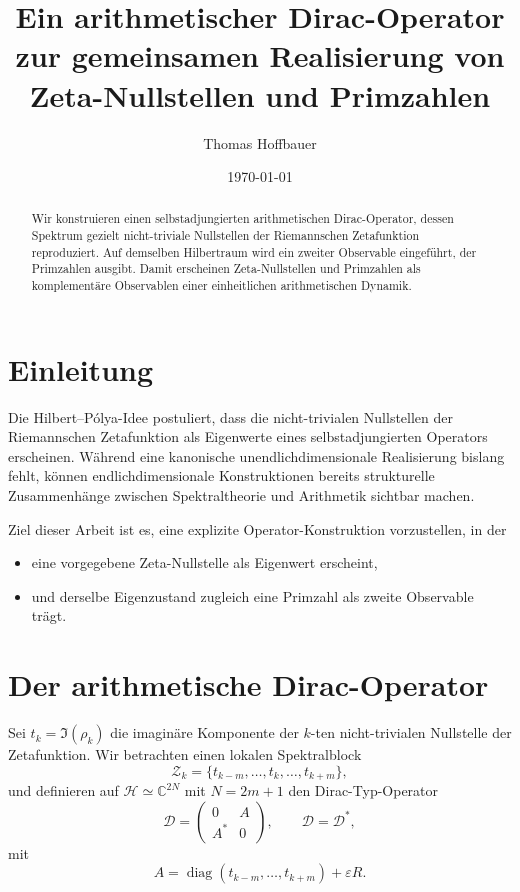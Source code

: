 \documentclass[11pt,a4paper]{article}
\title{Ein arithmetischer Dirac-Operator\\
zur gemeinsamen Realisierung von\\
Zeta-Nullstellen und Primzahlen}
\author{Thomas Hoffbauer}
\date{\today}
\begin{document}
\maketitle

\begin{abstract}
Wir konstruieren einen selbstadjungierten arithmetischen Dirac-Operator,
dessen Spektrum gezielt nicht-triviale Nullstellen der Riemannschen
Zetafunktion reproduziert.
Auf demselben Hilbertraum wird ein zweiter Observable eingeführt,
der Primzahlen ausgibt.
Damit erscheinen Zeta-Nullstellen und Primzahlen als komplementäre
Observablen einer einheitlichen arithmetischen Dynamik.
\end{abstract}

\section{Einleitung}

Die Hilbert--Pólya-Idee postuliert, dass die nicht-trivialen Nullstellen
der Riemannschen Zetafunktion als Eigenwerte eines selbstadjungierten
Operators erscheinen.
Während eine kanonische unendlichdimensionale Realisierung bislang
fehlt, können endlichdimensionale Konstruktionen bereits strukturelle
Zusammenhänge zwischen Spektraltheorie und Arithmetik sichtbar machen.

Ziel dieser Arbeit ist es, eine explizite Operator-Konstruktion
vorzustellen, in der

\begin{itemize}
  \item eine vorgegebene Zeta-Nullstelle als Eigenwert erscheint,
  \item und derselbe Eigenzustand zugleich eine Primzahl als zweite
        Observable trägt.
\end{itemize}

\section{Der arithmetische Dirac-Operator}

Sei $t_k=\Im(\rho_k)$ die imaginäre Komponente der $k$-ten
nicht-trivialen Nullstelle der Zetafunktion.
Wir betrachten einen lokalen Spektralblock
\[
\mathcal Z_k=\{t_{k-m},\dots,t_k,\dots,t_{k+m}\},
\]
und definieren auf $\mathcal H\simeq\mathbb C^{2N}$ mit $N=2m+1$ den
Dirac-Typ-Operator
\[
\mathcal D =
\begin{pmatrix}
0 & A\\
A^{*} & 0
\end{pmatrix},
\qquad \mathcal D=\mathcal D^{*},
\]
mit
\[
A=\operatorname{diag}(t_{k-m},\dots,t_{k+m})+\varepsilon R .
\]
\end{document}
